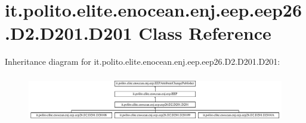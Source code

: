 \hypertarget{classit_1_1polito_1_1elite_1_1enocean_1_1enj_1_1eep_1_1eep26_1_1_d2_1_1_d201_1_1_d201}{}\section{it.\+polito.\+elite.\+enocean.\+enj.\+eep.\+eep26.\+D2.\+D201.\+D201 Class Reference}
\label{classit_1_1polito_1_1elite_1_1enocean_1_1enj_1_1eep_1_1eep26_1_1_d2_1_1_d201_1_1_d201}
Inheritance diagram for it.\+polito.\+elite.\+enocean.\+enj.\+eep.\+eep26.\+D2.\+D201.\+D201\+:\begin{figure}[H]
\begin{center}
\leavevmode
\includegraphics[height=2.085661cm]{classit_1_1polito_1_1elite_1_1enocean_1_1enj_1_1eep_1_1eep26_1_1_d2_1_1_d201_1_1_d201}
\end{center}
\end{figure}
